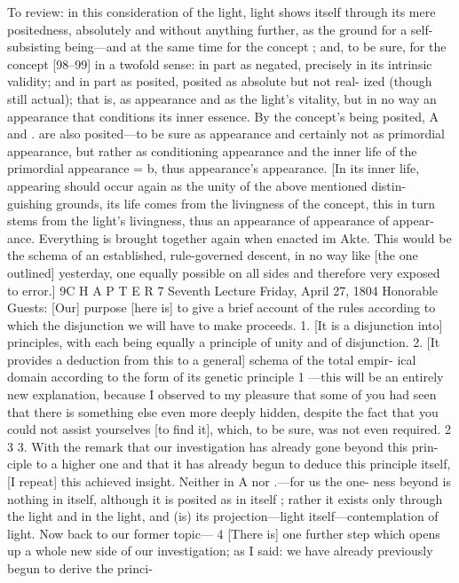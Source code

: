 To review: in this consideration of the light, light shows itself through
its mere positedness, absolutely and without anything further, as the ground
for a self-subsisting being—and at the same time for the concept ; and, to be
sure, for the concept [98–99] in a twofold sense: in part as negated, precisely
in its intrinsic validity; and in part as posited, posited as absolute but not real-
ized (though still actual); that is, as appearance and as the light’s vitality, but in
no way an appearance that conditions its inner essence. By the concept’s being
posited, A and . are also posited—to be sure as appearance and certainly not as
primordial appearance, but rather as conditioning appearance and the inner life
of the primordial appearance = b, thus appearance’s appearance. [In its inner life,
appearing should occur again as the unity of the above mentioned distin-
guishing grounds, its life comes from the livingness of the concept, this in turn
stems from the light’s livingness, thus an appearance of appearance of appear-
ance. Everything is brought together again when enacted {im Akte}. This
would be the schema of an established, rule-governed descent, in no way like
[the one outlined] yesterday, one equally possible on all sides and therefore
very exposed to error.] 9C H A P T E R
7
Seventh Lecture
Friday, April 27, 1804
Honorable Guests:
[Our] purpose [here is] to give a brief account of the rules according to which
the disjunction we will have to make proceeds.
1. [It is a disjunction into] principles, with each being equally a principle of
unity and of disjunction.
2. [It provides a deduction from this to a general] schema of the total empir-
ical domain according to the form of its genetic principle 1 —this will be an
entirely new explanation, because I observed to my pleasure that some of
you had seen that there is something else even more deeply hidden, despite
the fact that you could not assist yourselves [to find it], which, to be sure,
was not even required. 2
3
3. With the remark that our investigation has already gone beyond this prin-
ciple to a higher one and that it has already begun to deduce this principle
itself, [I repeat] this achieved insight. Neither in A nor .—for us the one-
ness beyond is nothing in itself, although it is posited as in itself ; rather it
exists only through the light and in the light, and (is) its projection—light
itself—contemplation of light. Now back to our former topic— 4
[There is] one further step which opens up a whole new side of our
investigation; as I said: we have already previously begun to derive the princi-
